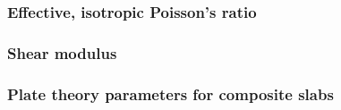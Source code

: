 \documentclass[hess, manuscript]{copernicus}
\begin{document}

\FloatBarrier

\subsubsection{Effective, isotropic Poisson's ratio}




\subsubsection{Shear modulus}


\subsubsection{Plate theory parameters for composite slabs}



\end{document}
